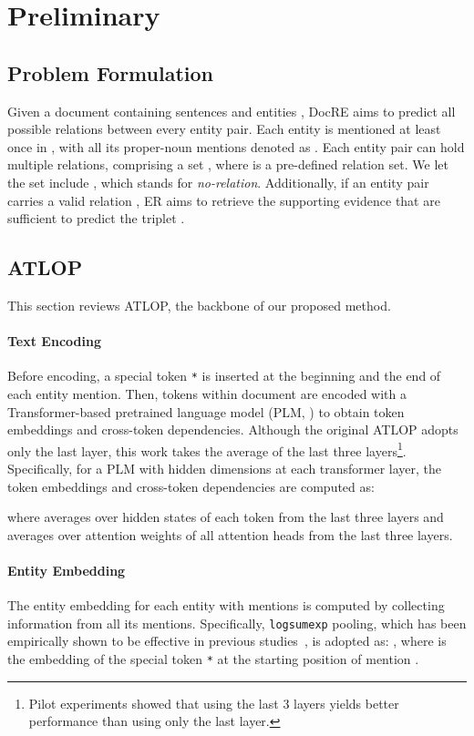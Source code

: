 \documentclass[11pt]{article}
\begin{document}
\section{Preliminary}
\subsection{Problem Formulation}

Given a document  containing sentences  and entities , DocRE aims to predict all possible relations between every entity pair. 
Each entity  is mentioned at least once in , with all its proper-noun mentions denoted as .
Each entity pair  can hold multiple relations, comprising a set , where  is a pre-defined relation set.
We let the set  include , which stands for \textit{no-relation}.
Additionally, if an entity pair  carries a valid relation , ER aims to retrieve the supporting evidence  that are sufficient to predict the triplet . 


\subsection{ATLOP}
\label{sec:model}
This section reviews ATLOP, the backbone of our proposed method.
\paragraph{Text Encoding} Before encoding, a special token \texttt{*} is inserted at the beginning and the end of each entity mention.
Then, tokens  within document  are encoded with a Transformer-based pretrained language model (PLM, \citealp{NIPS2017attention}) to obtain token embeddings and cross-token dependencies.
Although the original ATLOP adopts only the last layer, this work takes the average of the last three layers\footnote{Pilot experiments showed that using the last 3 layers yields better performance than using only the last layer.}.
Specifically, for a PLM with  hidden dimensions at each transformer layer, the token embeddings  and cross-token dependencies  are computed as:

where  averages over hidden states of each token from the last three layers and  averages over attention weights of all attention heads from the last three layers.
\paragraph{Entity Embedding}  The entity embedding  for each entity  with mentions  is computed by collecting information from all its mentions. 
Specifically, \texttt{logsumexp} pooling, which has been empirically shown to be effective in previous studies~\cite{jia-etal-2019-document}, is adopted as: , where  is the embedding of the special token \texttt{*} at the starting position of mention .
\end{document}
